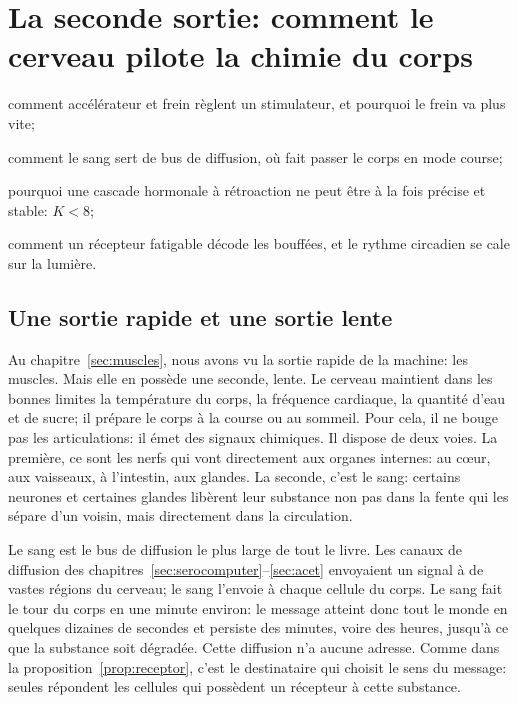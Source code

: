 \chapter{La seconde sortie: comment le cerveau pilote la chimie du corps}
\label{sec:chemoutput}
\begin{chaptergoals}
\item comment accélérateur  et frein  règlent un stimulateur, et pourquoi le frein va plus vite;
\item comment le sang sert de bus de diffusion, où  fait passer le corps en mode course;
\item pourquoi une cascade hormonale à rétroaction ne peut être à la fois précise et stable: $K<8$;
\item comment un récepteur fatigable décode les bouffées, et le rythme circadien se cale sur la lumière.
\end{chaptergoals}

\section{Une sortie rapide et une sortie lente}

Au chapitre~\ref{sec:muscles}, nous avons vu la sortie rapide de la machine: les muscles. Mais elle en possède une seconde, lente. Le cerveau maintient dans les bonnes limites la température du corps, la fréquence cardiaque, la quantité d'eau et de sucre; il prépare le corps à la course ou au sommeil. Pour cela, il ne bouge pas les articulations: il émet des signaux chimiques. Il dispose de deux voies. La première, ce sont les nerfs qui vont directement aux organes internes: au cœur, aux vaisseaux, à l'intestin, aux glandes. La seconde, c'est le sang: certains neurones et certaines glandes libèrent leur substance non pas dans la fente qui les sépare d'un voisin, mais directement dans la circulation.

Le sang est le bus de diffusion le plus large de tout le livre. Les canaux de diffusion des chapitres~\ref{sec:serocomputer}--\ref{sec:acet} envoyaient un signal à de vastes régions du cerveau; le sang l'envoie à chaque cellule du corps. Le sang fait le tour du corps en une minute environ: le message atteint donc tout le monde en quelques dizaines de secondes et persiste des minutes, voire des heures, jusqu'à ce que la substance soit dégradée. Cette diffusion n'a aucune adresse. Comme dans la proposition~\ref{prop:receptor}, c'est le destinataire qui choisit le sens du message: seules répondent les cellules qui possèdent un récepteur à cette substance.

